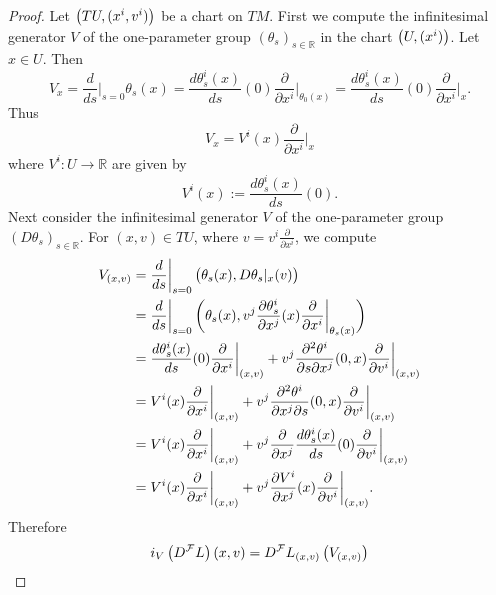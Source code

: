 \begin{proof}
	Let $\del[1]{TU,(x^i,v^i)}$ be a chart on $TM$. First we compute the infinitesimal generator $V$ of the one-parameter group $(\theta_s)_{s \in \mathbb{R}}$ in the chart $\del[1]{U,(x^i)}$. Let $x \in U$. Then
	\begin{equation*}
		V_x = \frac{d}{ds}\bigg\vert_{s = 0}\theta_s(x) = \frac{d\theta_s^i(x)}{ds}(0) \frac{\partial}{\partial x^i}\bigg\vert_{\theta_0(x)} = \frac{d\theta_s^i(x)}{ds}(0) \frac{\partial}{\partial x^i}\bigg\vert_x.
	\end{equation*}
	Thus 
	\begin{equation*}
		V_x = V^i(x) \frac{\partial}{\partial x^i}\bigg\vert_x 
	\end{equation*}
	\noindent where $V^i : U \to \mathbb{R}$ are given by
	\begin{equation*}
		V^i(x) := \frac{d \theta_s^i(x)}{ds}(0).
	\end{equation*}
	Next consider the infinitesimal generator $V$ of the one-parameter group $(D\theta_s)_{s \in \mathbb{R}}$. For $(x,v) \in TU$, where $v = v^i \frac{\partial}{\partial x^i}$, we compute
	\begin{align*}
		V_{(x,v)} &= \frac{d}{ds}\bigg\vert_{s = 0} \del[1]{\theta_s(x),D\theta_s\vert_x(v)}\\
		&= \frac{d}{ds}\bigg\vert_{s = 0} \del[3]{\theta_s(x),v^j\frac{\partial \theta_s^i}{\partial x^j}(x)\frac{\partial}{\partial x^i}\bigg\vert_{\theta_s(x)}}\\
		&= \frac{d \theta_s^i(x)}{ds}(0)\frac{\partial}{\partial x^i}\bigg\vert_{(x,v)} + v^j\frac{\partial^2 \theta^i}{\partial s\partial x^j}(0,x) \frac{\partial}{\partial v^i}\bigg\vert_{(x,v)}\\
		&= V^i(x)\frac{\partial}{\partial x^i}\bigg\vert_{(x,v)} + v^j\frac{\partial^2 \theta^i}{\partial x^j\partial s}(0,x) \frac{\partial}{\partial v^i}\bigg\vert_{(x,v)}\\
		&= V^i(x)\frac{\partial}{\partial x^i}\bigg\vert_{(x,v)} + v^j\frac{\partial}{\partial x^j} \frac{d \theta_s^i(x)}{ds}(0) \frac{\partial}{\partial v^i}\bigg\vert_{(x,v)}\\
		&= V^i(x)\frac{\partial}{\partial x^i}\bigg\vert_{(x,v)} + v^j\frac{\partial V^i}{\partial x^j}(x) \frac{\partial}{\partial v^i}\bigg\vert_{(x,v)}.
	\end{align*}
	Therefore
	\begin{align*}
		i_V\del[1]{D^\mathcal{F}L}(x,v) &= D^\mathcal{F}L_{(x,v)}\del[1]{V_{(x,v)}}\\

\end{align*}
\end{proof}
